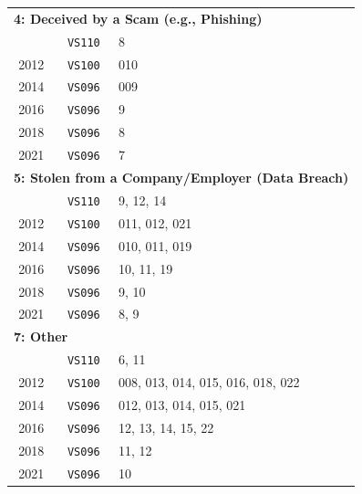 \begin{longtable}{c c p{7.5cm}}
\multicolumn{3}{l}{\textbf{4: Deceived by a Scam (e.g., Phishing)}} \\ \addlinespace
2008 & \texttt{VS110} & 8 \\
2012 & \texttt{VS100} & 010 \\
2014 & \texttt{VS096} & 009 \\
2016 & \texttt{VS096} & 9 \\
2018 & \texttt{VS096} & 8 \\
2021 & \texttt{VS096} & 7 \\
\midrule

\multicolumn{3}{l}{\textbf{5: Stolen from a Company/Employer (Data Breach)}} \\ \addlinespace
2008 & \texttt{VS110} & 9, 12, 14 \\
2012 & \texttt{VS100} & 011, 012, 021 \\
2014 & \texttt{VS096} & 010, 011, 019 \\
2016 & \texttt{VS096} & 10, 11, 19 \\
2018 & \texttt{VS096} & 9, 10 \\
2021 & \texttt{VS096} & 8, 9 \\
\midrule

\multicolumn{3}{l}{\textbf{7: Other}} \\ \addlinespace
2008 & \texttt{VS110} & 6, 11 \\
2012 & \texttt{VS100} & 008, 013, 014, 015, 016, 018, 022 \\
2014 & \texttt{VS096} & 012, 013, 014, 015, 021 \\
2016 & \texttt{VS096} & 12, 13, 14, 15, 22 \\
2018 & \texttt{VS096} & 11, 12 \\
2021 & \texttt{VS096} & 10 \\

\end{longtable}

